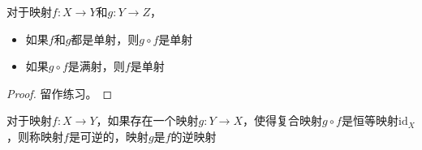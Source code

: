 \documentclass[main.tex]{subfiles}
\begin{document}
\begin{theorem}
对于映射$f:X\rightarrow Y$和$g: Y\rightarrow Z$，
\begin{itemize}
    \item 如果$f$和$g$都是单射，则$g\circ f$是单射
    \item 如果$g\circ f$是满射，则$f$是单射
\end{itemize}
\end{theorem}
\begin{proof}
留作练习。
\end{proof}

\begin{definition}[逆映射]\label{def:II.1.14}
对于映射$f:X\rightarrow Y$，如果存在一个映射$g:Y\rightarrow X$，使得复合映射$g\circ f$是恒等映射$\mathrm{id}_X$，则称映射$f$是可逆的，映射$g$是$f$的逆映射
\end{definition}
\end{document}
